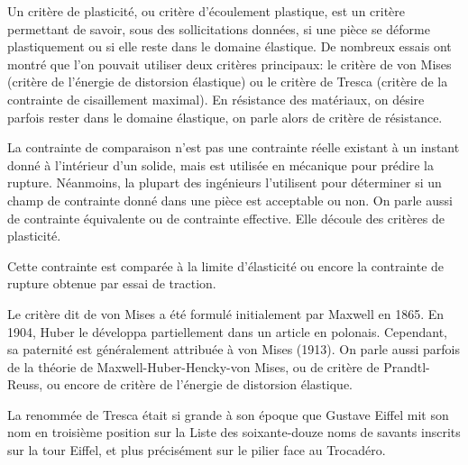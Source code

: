\newpage%
\begin{histoire}
Un critère de plasticité, ou critère d'écoulement plastique, est un critère permettant de savoir, sous des sollicitations données,
si une pièce se déforme plastiquement ou si elle reste dans le domaine élastique.
De nombreux essais ont montré que l'on pouvait utiliser deux critères principaux: le critère de von Mises
(critère de l'énergie de distorsion élastique) ou le critère de Tresca
(critère de la contrainte de cisaillement maximal).
En résistance des matériaux, on désire parfois rester dans le domaine élastique, on parle alors de critère de résistance.

La contrainte de comparaison n'est pas une contrainte réelle existant à un instant donné à l'intérieur d'un solide, mais est utilisée
en mécanique pour prédire la rupture. Néanmoins, la plupart des ingénieurs l'utilisent pour déterminer si un champ de contrainte
donné dans une pièce est acceptable ou non. On parle aussi de contrainte équivalente ou de contrainte effective. Elle découle des
critères de plasticité.

Cette contrainte est comparée à la limite d'élasticité ou encore la contrainte de rupture obtenue par essai de traction.

\medskip
Le critère dit de von Mises
a été formulé initialement par Maxwell en 1865.
En 1904, Huber le développa partiellement dans un
article en polonais.
Cependant, sa paternité est généralement attribuée à von Mises (1913).
On parle aussi parfois de la théorie de Maxwell-Huber-Hencky-von Mises,
ou de critère de Prandtl-Reuss,
ou encore de critère de l'énergie de distorsion élastique.

\medskip
La renommée de Tresca
était si grande à son époque que Gustave Eiffel
mit son nom en troisième position sur la Liste des soixante-douze noms de savants inscrits sur la tour Eiffel,
et plus précisément sur le pilier face au Trocadéro.


\end{histoire}
